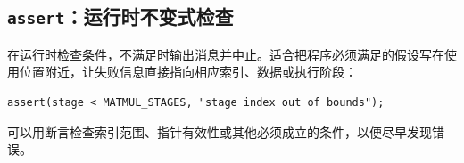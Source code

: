 \subsection*{\texttt{assert}：运行时不变式检查}

\co@assert@ 在运行时检查条件，不满足时输出消息并中止。适合把程序必须满足的假设写在使用位置附近，让失败信息直接指向相应索引、数据或执行阶段：

\begin{lstlisting}[language=croqtile,caption={assert：运行时不变式检查}]
assert(stage < MATMUL_STAGES, "stage index out of bounds");
\end{lstlisting}

可以用断言检查索引范围、指针有效性或其他必须成立的条件，以便尽早发现错误。
